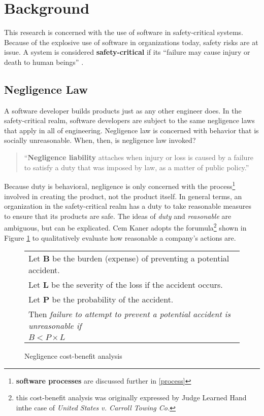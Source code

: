 \section{Background}
This research is concerned with the use of software in safety-critical systems.
Because of the explosive use of software in organizations today, safety risks
are at issue. A system is considered \textbf{safety-critical} if its ``failure
may cause injury or death to human beings'' \cite{FOLDOC}.

\subsection{Negligence Law}
A software developer builds products just as any other engineer does. In the
safety-critical realm, software developers are subject to the same negligence
laws that apply in all of engineering. Negligence law is concerned with behavior
that is socially unreasonable. When, then, is negligence law invoked?

\begin{quote}
``\textbf{Negligence liability} attaches when injury or loss is caused by a 
failure to satisfy a duty that was imposed by law, as a matter of public
policy.'' \cite{Kaner_neg_1995}
\end{quote}

Because duty is behavioral, negligence is only concerned with the
process\footnote{\textbf{software processes} are discussed further in
\ref{process}} involved in creating the product, not the product itself. In
general terms, an organization in the safety-critical realm has a duty to take
reasonable measures to ensure that its products are safe. The ideas of
\textit{duty} and \textit{reasonable} are ambiguous, but can be explicated. Cem 
Kaner adopts the forumula\footnote{this cost-benefit analysis was originally
expressed by Judge Learned Hand inthe case of  \textit{United States v. Carroll
Towing Co.}} shown in Figure \ref{fig:negligence} to qualitatively evaluate how
reasonable a company's actions are.
\begin{figure}
\begin{tabular}{|l|}
\hline
	Let \textbf{B} be the burden (expense) of preventing a potential accident.\\
	Let \textbf{L} be the severity of the loss if the accident occurs.\\
	Let \textbf{P} be the probability of the accident.\\[6pt]
	Then \textit{failure to attempt to prevent a potential accident is 
	unreasonable if}\\[8pt]

      \centerline{\(B < P \times L\)}
\\[3pt]
\hline
\end{tabular}
\caption{Negligence cost-benefit analysis \cite{Kaner_neg_1995}}
\label{fig:negligence}
\end{figure}

